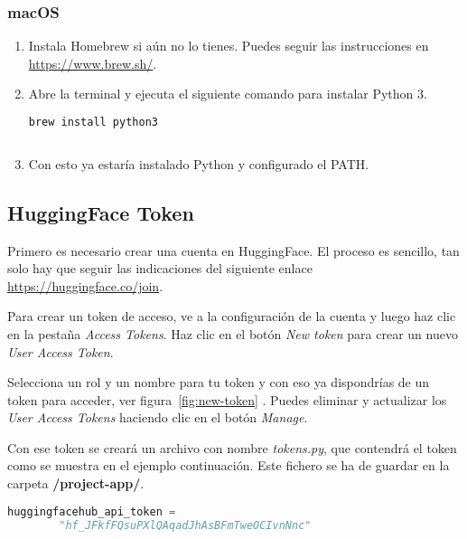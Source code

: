 \subsubsection{macOS}

\begin{enumerate}
     \item Instala Homebrew si aún no lo tienes. Puedes seguir las instrucciones en \url{https://www.brew.sh/}.
     
     \item Abre la terminal y ejecuta el siguiente comando para instalar Python 3.
\begin{lstlisting}[language=Python, caption=Instalaciónde Python en macOS.]
    brew install python3
    
\end{lstlisting}
     
     \item Con esto ya estaría instalado Python y configurado el PATH.
\end{enumerate}

\subsection{HuggingFace Token}

Primero es necesario crear una cuenta en HuggingFace. El proceso es sencillo, tan solo hay que seguir las indicaciones del siguiente enlace \url{https://huggingface.co/join}.

Para crear un token de acceso, ve a la configuración de la cuenta y luego haz clic en la pestaña \textit{Access Tokens}. Haz clic en el botón \textit{New token} para crear un nuevo \textit{User Access Token}.

Selecciona un rol y un nombre para tu token y con eso ya dispondrías de un token para acceder, ver figura~\ref{fig:new-token} . Puedes eliminar y actualizar los \textit{User Access Tokens} haciendo clic en el botón \textit{Manage}.


Con ese token se creará un archivo con nombre \textit{tokens.py}, que contendrá el token como se muestra en el ejemplo continuación. Este fichero se ha de guardar en la carpeta \textbf{/project-app/}.

\begin{lstlisting}[language=Python, caption=Configuración del fichero tokens.py.]
    huggingfacehub_api_token = 
        "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"
\end{lstlisting}

